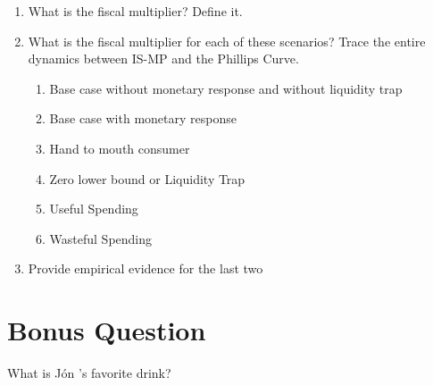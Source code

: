 \documentclass[11pt]{scrartcl}
\newcommand{\jon}{J\'{o}n }
\begin{document}
\begin{enumerate}
\item What is the fiscal multiplier? Define it.
\item What is the fiscal multiplier for each of these scenarios? Trace the entire dynamics between IS-MP and the Phillips Curve.
\begin{enumerate}
\item Base case without monetary response and without liquidity trap
\item Base case with monetary response
\item Hand to mouth consumer
\item Zero lower bound or Liquidity Trap
\item Useful Spending
\item Wasteful Spending
\end{enumerate}
\item Provide empirical evidence for the last two
\end{enumerate}

\section{Bonus Question}

What is \jon's favorite drink?
\end{document}
